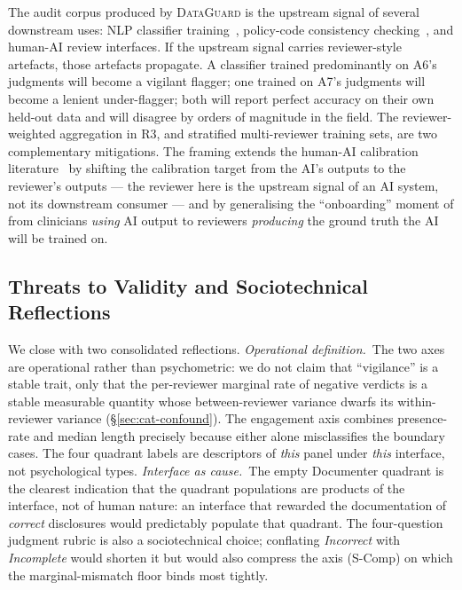 \documentclass[11pt,a4paper]{article}
\newcommand{\dataguard}{\textsc{DataGuard}}
\newcommand{\Acc}[1]{\textsf{A#1}}
\begin{document}
The audit corpus produced by \dataguard{} is the upstream signal of
several downstream uses: NLP classifier
training~\citep{wilson2016creation,sathyendra2017identifying,
harkous2018polisis,zimmeck2019maps}, policy-code consistency
checking~\citep{slavin2016toward,andow2020policheck}, and human-AI
review interfaces. If the upstream signal carries reviewer-style
artefacts, those artefacts propagate. A classifier trained
predominantly on \Acc{6}'s judgments will become a vigilant flagger;
one trained on \Acc{7}'s judgments will become a lenient
under-flagger; both will report perfect accuracy on their own
held-out data and will disagree by orders of magnitude in the
field. The reviewer-weighted aggregation in R3, and stratified
multi-reviewer training sets, are two complementary mitigations.
The framing extends the human-AI calibration
literature~\citep{amershi2019guidelines,cai2019hello,liao2020questioning}
by shifting the calibration target from the AI's outputs to the
reviewer's outputs --- the reviewer here is the upstream signal of
an AI system, not its downstream consumer --- and by generalising
the ``onboarding'' moment of \citet{cai2019hello} from clinicians
\emph{using} AI output to reviewers \emph{producing} the ground
truth the AI will be trained on.

\subsection{Threats to Validity and Sociotechnical Reflections}
\label{sec:disc-validity}

We close with two consolidated reflections. \emph{Operational
definition.}\ The two axes are operational rather than psychometric:
we do not claim that ``vigilance'' is a stable trait, only that the
per-reviewer marginal rate of negative verdicts is a stable
measurable quantity whose between-reviewer variance dwarfs its
within-reviewer variance (\S\ref{sec:cat-confound}). The
engagement axis combines presence-rate and median length precisely
because either alone misclassifies the boundary cases. The four
quadrant labels are descriptors of \emph{this} panel under
\emph{this} interface, not psychological types.
\emph{Interface as cause.}\ The empty Documenter quadrant is the
clearest indication that the quadrant populations are products of
the interface, not of human nature: an interface that rewarded the
documentation of \emph{correct} disclosures would predictably
populate that quadrant. The four-question judgment rubric is also
a sociotechnical choice; conflating \emph{Incorrect} with
\emph{Incomplete} would shorten it but would also compress the
axis (S-Comp) on which the marginal-mismatch floor binds most
tightly.
\end{document}
